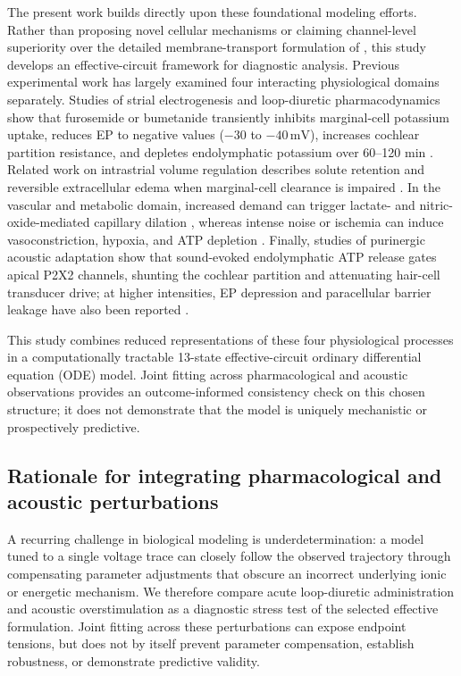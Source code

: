 \documentclass[final,5p,times]{elsarticle}
\begin{document}
The present work builds directly upon these foundational modeling efforts. Rather than proposing novel cellular mechanisms or claiming channel-level superiority over the detailed membrane-transport formulation of \citet{Nin2012}, this study develops an effective-circuit framework for diagnostic analysis. Previous experimental work has largely examined four interacting physiological domains separately. Studies of strial electrogenesis and loop-diuretic pharmacodynamics show that furosemide or bumetanide transiently inhibits marginal-cell potassium uptake, reduces EP to negative values (\(-30\) to \(-40\,\mathrm{mV}\)), increases cochlear partition resistance, and depletes endolymphatic potassium over 60--120 min \citep{Bosher1979,PikeBosher1980,AsakumaSnow1980,RybakMorizono1982}. Related work on intrastrial volume regulation describes solute retention and reversible extracellular edema when marginal-cell clearance is impaired \citep{SantiDuvall1979,PikeBosher1980,Salt2001}. In the vascular and metabolic domain, increased demand can trigger lactate- and nitric-oxide-mediated capillary dilation \citep{Dai2011}, whereas intense noise or ischemia can induce vasoconstriction, hypoxia, and ATP depletion \citep{PrazmaPecorak1975,Kusakari1978,Nuttall1999,Shi2016,Hou2020}. Finally, studies of purinergic acoustic adaptation show that sound-evoked endolymphatic ATP release gates apical P2X2 channels, shunting the cochlear partition and attenuating hair-cell transducer drive; at higher intensities, EP depression and paracellular barrier leakage have also been reported \citep{Munoz2001,Telang2010,Housley2013,SaltKonishi1979,Wang1990,Wang1992,Ohlemiller2018}.

This study combines reduced representations of these four physiological processes in a computationally tractable 13-state effective-circuit ordinary differential equation (ODE) model. Joint fitting across pharmacological and acoustic observations provides an outcome-informed consistency check on this chosen structure; it does not demonstrate that the model is uniquely mechanistic or prospectively predictive.

\subsection{Rationale for integrating pharmacological and acoustic perturbations}\label{sec:intro-motivation}

A recurring challenge in biological modeling is underdetermination: a model tuned to a single voltage trace can closely follow the observed trajectory through compensating parameter adjustments that obscure an incorrect underlying ionic or energetic mechanism. We therefore compare acute loop-diuretic administration and acoustic overstimulation as a diagnostic stress test of the selected effective formulation. Joint fitting across these perturbations can expose endpoint tensions, but does not by itself prevent parameter compensation, establish robustness, or demonstrate predictive validity.
\end{document}
